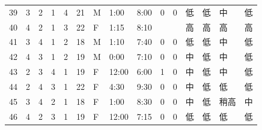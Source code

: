 \begin{table}[htbp]
{\begin{tabular}{lllllllllllllll}
39                  & 3                      & 2                       & 1                      & 4                       & 21                     & M                   & 1:00                  & 8:00                  & 0                    & 0                    & 低       & 低       & 中    & 低  \\
40                  & 4                      & 2                       & 1                      & 3                       & 22                     & F                   & 1:15                  & 8:10                  &                      &                      & 高       & 高       & 高    & 高  \\
41                  & 3                      & 4                       & 1                      & 2                       & 18                     & M                   & 1:10                  & 7:40                  & 0                    & 0                    & 低       & 低       & 中    & 低  \\
42                  & 4                      & 3                       & 1                      & 2                       & 19                     & M                   & 0:00                  & 7:10                  & 0                    & 0                    & 中       & 低       & 中    & 低  \\
43                  & 2                      & 3                       & 4                      & 1                       & 19                     & F                   & 12:00                 & 6:00                  & 1                    & 0                    & 中       & 低       & 中    & 低  \\
44                  & 2                      & 4                       & 3                      & 1                       & 22                     & F                   & 4:30                  & 9:30                  & 0                    & 0                    & 中       & 低       & 低    & 低  \\
45                  & 3                      & 4                       & 2                      & 1                       & 18                     & F                   & 1:00                  & 8:30                  & 0                    & 0                    & 中       & 低       & 稍高   & 中  \\
46                  & 4                      & 2                       & 3                      & 1                       & 19                     & F                   & 12:00                 & 7:15                  & 0                    & 0                    & 低       & 低       & 低    & 低  \\

\end{tabular}}
\end{table}
